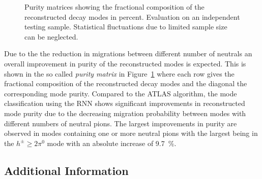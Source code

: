 \begin{figure}[htb]
\begin{subfigure}[t]{0.48\textwidth}
  \end{subfigure}
  \caption{Purity matrices showing the fractional composition of the
    reconstructed decay modes in \si{percent}. Evaluation on an independent
    testing sample. Statistical fluctuations due to limited sample size can be
    neglected.}
  \label{fig:puritymat_comparison_baseline_15cut}
\end{figure}

Due to the the reduction in migrations between different number of neutrals an
overall improvement in purity of the reconstructed modes is expected. This is
shown in the so called \emph{purity matrix} in
Figure~\ref{fig:puritymat_comparison_baseline_15cut} where each row gives the
fractional composition of the reconstructed decay modes and the diagonal the
corresponding mode purity. Compared to the ATLAS algorithm, the mode
classification using the RNN shows significant improvements in reconstructed
mode purity due to the decreasing migration probability between modes with
different numbers of neutral pions. The largest improvements in purity are
observed in modes containing one or more neutral pions with the largest being in
the $h^\pm \geq 2\pi^0$ mode with an absolute increase of \SI{9.7}{\percent}.


\subsection{Additional Information}
\label{sec:add_info}



